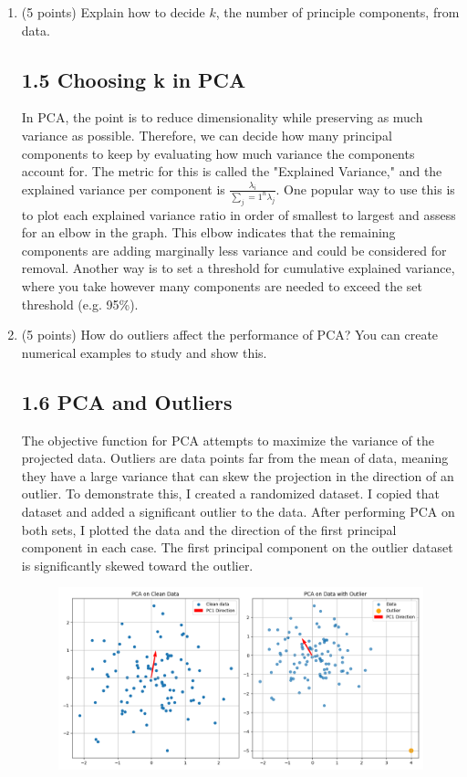 \documentclass[twoside,10pt]{article}
\begin{document}
\begin{enumerate}
\item (5 points) Explain how to decide $k$, the number of principle components, from data.
\subsection*{1.5 Choosing k in PCA}
In PCA, the point is to reduce dimensionality while preserving as much variance as possible. Therefore, we can decide how many principal components to keep by evaluating how much variance the components account for. The metric for this is called the "Explained Variance," and the explained variance per component is $\frac{\lambda_i}{\sum_j=1^n \lambda_j}$. One popular way to use this is to plot each explained variance ratio in order of smallest to largest and assess for an elbow in the graph. This elbow indicates that the remaining components are adding marginally less variance and could be considered for removal. Another way is to set a threshold for cumulative explained variance, where you take however many components are needed to exceed the set threshold (e.g. 95\%).
\item (5 points) How do outliers affect the performance of PCA? You can create numerical examples to study and show this.
\subsection*{1.6 PCA and Outliers}
The objective function for PCA attempts to maximize the variance of the projected data. Outliers are data points far from the mean of data, meaning they have a large variance that can skew the projection in the direction of an outlier. To demonstrate this, I created a randomized dataset. I copied that dataset and added a significant outlier to the data. After performing PCA on both sets, I plotted the data and the direction of the first principal component in each case. The first principal component on the outlier dataset is significantly skewed toward the outlier.

\begin{figure}[H]
    \centering
    \includegraphics[width=\textwidth]{images/q1-6_pca_plot.png}
    \label{fig:pca_outlier}
\end{figure}

\end{enumerate}
\end{document}
